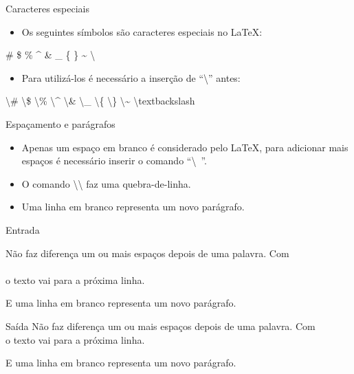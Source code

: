 \begin{frame}{Caracteres especiais}
	\begin{itemize}
	\item Os seguintes símbolos são caracteres especiais no \LaTeX:
	\end{itemize}

	\alert{\# \$ \% \^{} \& \_ \{ \} \~{} \textbackslash}

	\begin{itemize}
	\item Para utilizá-los é necessário a inserção de ``\textbackslash'' antes:
	\end{itemize}

	\alert{
	   \textbackslash\# 
	   \textbackslash\$ 
	   \textbackslash\% 
	   \textbackslash\^{} 
	   \textbackslash\& 
	   \textbackslash\_ 
	   \textbackslash\{ 
	   \textbackslash\} 
	   \textbackslash\~{} 
	   \textbackslash textbackslash
	}
\end{frame}

\begin{frame}[fragile]{Espaçamento e parágrafos}
	\begin{itemize}
	\item Apenas um espaço em branco é considerado pelo \LaTeX, para adicionar mais espaços é necessário inserir o comando \alert{``\textbackslash\ ''}.
	\item O comando \alert{\textbackslash\textbackslash} faz uma quebra-de-linha.
	\item Uma linha em branco representa um novo parágrafo.
	\end{itemize}

    
    \begin{block}{Entrada}
        \small
        \begin{semiverbatim}
\small{}Não faz diferença um ou mais        espaços depois de uma
palavra. Com \\\\ o texto vai para a próxima linha.

E uma linha em branco representa um novo parágrafo.
\end{semiverbatim}
    \end{block}    
    
    \begin{block}{Saída}
        \small
        Não faz diferença um ou mais       espaços depois de uma palavra. Com \\ o texto vai para a próxima linha.

        E uma linha em branco representa um novo parágrafo.
    \end{block}
\end{frame}

